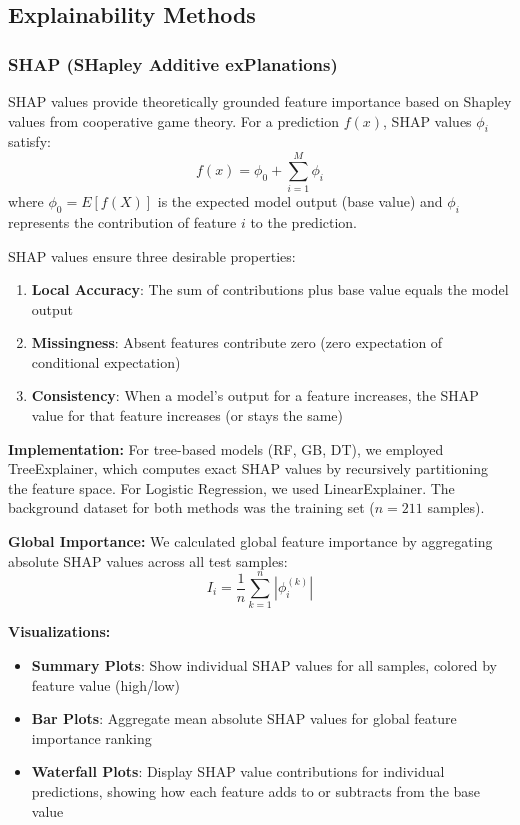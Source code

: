 \documentclass[journal]{IEEEtran}
\begin{document}
\subsection{Explainability Methods}\label{subsec:xai_methods}

\subsubsection{SHAP (SHapley Additive exPlanations)}

SHAP values provide theoretically grounded feature importance based on Shapley values from cooperative game theory. For a prediction $f(x)$, SHAP values $\phi_i$ satisfy:
\[
f(x) = \phi_0 + \sum_{i=1}^{M} \phi_i
\]
where $\phi_0 = E[f(X)]$ is the expected model output (base value) and $\phi_i$ represents the contribution of feature $i$ to the prediction.

SHAP values ensure three desirable properties:
\begin{enumerate}
    \item \textbf{Local Accuracy}: The sum of contributions plus base value equals the model output
    \item \textbf{Missingness}: Absent features contribute zero (zero expectation of conditional expectation)
    \item \textbf{Consistency}: When a model's output for a feature increases, the SHAP value for that feature increases (or stays the same)
\end{enumerate}

\textbf{Implementation:} For tree-based models (RF, GB, DT), we employed TreeExplainer, which computes exact SHAP values by recursively partitioning the feature space. For Logistic Regression, we used LinearExplainer. The background dataset for both methods was the training set ($n = 211$ samples).

\textbf{Global Importance:} We calculated global feature importance by aggregating absolute SHAP values across all test samples:
\[
I_i = \frac{1}{n} \sum_{k=1}^{n} |\phi_i^{(k)}|
\]

\textbf{Visualizations:}
\begin{itemize}
    \item \textbf{Summary Plots}: Show individual SHAP values for all samples, colored by feature value (high/low)
    \item \textbf{Bar Plots}: Aggregate mean absolute SHAP values for global feature importance ranking
    \item \textbf{Waterfall Plots}: Display SHAP value contributions for individual predictions, showing how each feature adds to or subtracts from the base value
\end{itemize}
\end{document}
